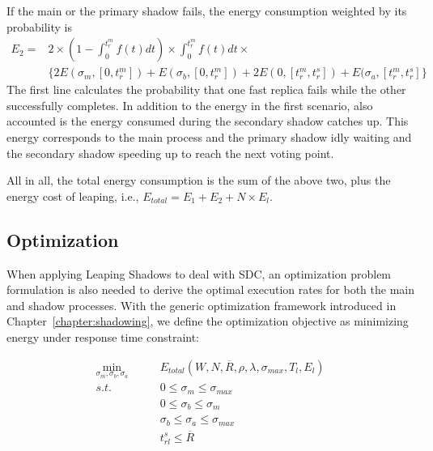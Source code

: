 If the main or the primary shadow fails, the energy consumption weighted by its probability is 
\begin{equation}
\begin{split}
E_2 = & 2 \times (1 - \int_{0}^{t_r^m} f(t)dt) \times \int_{0}^{t_r^m} f(t)dt \times 
\\  & \{2E(\sigma_m, [0, t_r^m])+E(\sigma_b, [0, t_r^m])  + 2E(0, [t_r^m, t_r^s])+E(\sigma_a, [t_r^m, t_r^s]\} 
\end{split}
\end{equation}
The first line calculates the probability that one fast replica fails while the other successfully completes. In addition to the energy in the first scenario, also accounted is the energy consumed during the secondary shadow catches up. This energy corresponds to the main process and the primary shadow idly waiting and the secondary shadow speeding up to reach the next voting point. 



All in all, the total energy consumption is the sum of the above two, plus the energy cost of leaping, i.e., $E_{total}=E_1 + E_2 + N\times E_l$. 

\subsection{Optimization}
\label{sec:silent_opt}
When applying Leaping Shadows to deal with SDC, an optimization problem formulation is also needed to derive the optimal execution rates for both the main and shadow processes. With the generic optimization framework introduced in Chapter~\ref{chapter:shadowing}, we define the optimization objective as minimizing energy under response time constraint:

\begin{equation}
\begin{alignedat}{2}
\min_{\sigma_m,\sigma_b,\sigma_a} \qquad  & E_{total} (W,N,\overline{R},\rho,\lambda,\sigma_{max}, T_l, E_l)  \\
s.t.  \qquad          & 0 \leq \sigma_m \leq \sigma_{max} \\
                      & 0 \leq \sigma_b \leq \sigma_m\\
                      & \sigma_b \leq \sigma_a \leq \sigma_{max} \\
                      & t_{rl}^s \leq \overline{R}
\end{alignedat}
\end{equation}



